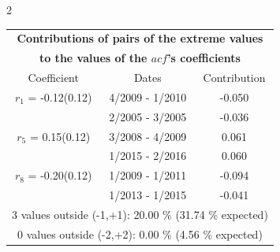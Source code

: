 
\thispagestyle{empty}
\begin{multicols}{2}{ 
\begin{tabular}{ccc}
\multicolumn{3}{c}{\textbf{Contributions of pairs of the extreme values} }  \vspace{-.10in}  \\ 
\multicolumn{3}{c}{ \textbf{to the values of the $acf$'s coefficients}} \\ 
\hline 
\hline                  Coefficient  &  Dates &  Contribution \\ 
\hline 
  $r_{ 1}$ = -0.12(0.12) &       4/2009 -  1/2010 &       -0.050    \vspace{-.10in} \\ 
  &        2/2005 -  3/2005 &       -0.036  \vspace{-.02in}   \\ \hline 
    $r_{ 5}$ = 0.15(0.12) &       3/2008 -  4/2009 &        0.061   \vspace{-.10in} \\  
&        1/2015 -  2/2016 &        0.060  \vspace{-.02in} \\ \hline 
  $r_{ 8}$ = -0.20(0.12) &       1/2009 -  1/2011 &       -0.094    \vspace{-.10in} \\ 
  &        1/2013 -  1/2015 &       -0.041  \vspace{-.02in}   \\ \hline 
  \multicolumn{3}{c}{               3 values outside (-1,+1): 20.00  \% (31.74  \% expected)}\vspace{-.10in} \\ 
\multicolumn{3}{c}{               0 values outside (-2,+2):  0.00 \%  (4.56 \% expected) } \\
 \end{tabular} \\ 
 } 
\end{multicols} 
